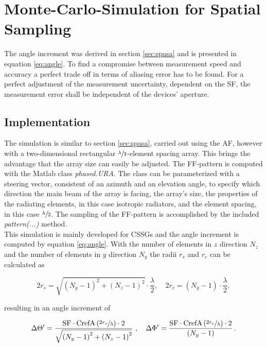 \chapter{Monte-Carlo-Simulation for Spatial Sampling}

The angle increment was derived in section \ref{sec:spasa} and is presented in equation \ref{eq:angle}. To find a compromise between measurement speed and accuracy a perfect trade off in terms of aliasing error has to be found. For a perfect adjustment of the measurement uncertainty, dependent on the \ac{SF}, the measurement error shall be independent of the devices' aperture.

\section{Implementation}

The simulation is similar to section \ref{sec:spasa}, carried out using the \ac{AF}, however with a two-dimensional rectangular $\sfrac{\lambda}{2}$-element spacing array. This brings the advantage that the array size can easily be adjusted. The \ac{FF}-pattern is computed with the Matlab\texttrademark{} class \textit{phased.URA}.
The class can be parameterized with a steering vector, consistent of an azimuth and an elevation angle, to specify which direction the main beam of the array is facing, the array's size, the properties of the radiating elements, in this case isotropic radiators, and the element spacing, in this case $\sfrac{\lambda}{2}$.
The sampling of the \ac{FF}-pattern is accomplished by the included \textit{pattern(...)} method.\\
This simulation is mainly developed for \acp{CSSG} and the angle increment is computed by equation \ref{eq:angle}. With the number of elements in $z$ direction $N_z$ and the number of elements in $y$ direction $N_y$ the radii $r_s$ and $r_c$ can be calculated as

\begin{equation}
2r_s = \sqrt{\left(N_y-1\right)^2+\left(N_z-1\right)^2}\cdot\frac{\lambda}{2},\quad 2r_c=\left(N_y-1\right)\cdot\frac{\lambda}{2},
\end{equation}

resulting in an angle increment of

\begin{equation}
\Delta\Theta^\prime = \frac{\text{SF}\cdot\text{CrefA}\left(\sfrac{2r_s}{\lambda}\right)\cdot 2}{\sqrt{\left(N_y-1\right)^2+\left(N_z-1\right)^2}}\ ,\quad\Delta\Phi^\prime = \frac{\text{SF}\cdot\text{CrefA}\left(\sfrac{2r_c}{\lambda}\right)\cdot 2}{\left(N_y-1\right)}\,.
\end{equation}

